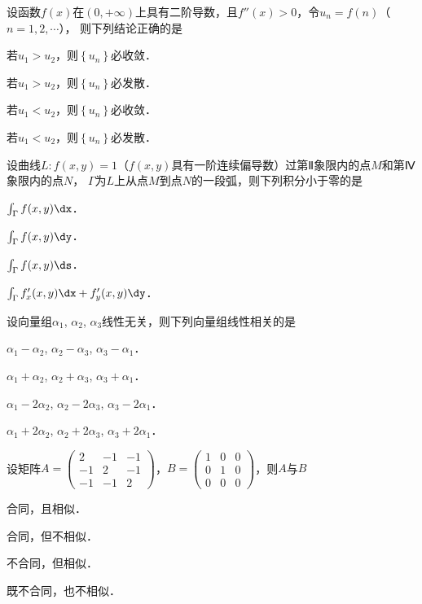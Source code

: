 \documentclass[plain,noanswer,medmath]{../../template/jnuexam}
\begin{document}
\begin{problem}
设函数$f(x)$在$(0, +\infty)$上具有二阶导数，且$f''(x) > 0$，令$u_n = f(n)$（$n=1,2,\cdots$），
则下列结论正确的是\pickout{}
\begin{abcd}
\item 若$u_1 > u_2$，则$\left\{u_n \right\}$必收敛．
\item 若$u_1 > u_2$，则$\left\{u_n \right\}$必发散．
\item 若$u_1 < u_2$，则$\left\{u_n \right\}$必收敛．
\item 若$u_1 < u_2$，则$\left\{u_n \right\}$必发散．
\end{abcd}
\end{problem}


\begin{problem}
设曲线$L:f(x,y) = 1$（$f(x,y)$具有一阶连续偏导数）过第Ⅱ象限内的点$M$和第Ⅳ象限内的点$N$，
$\Gamma$为$L$上从点$M$到点$N$的一段弧，则下列积分小于零的是\pickout{}
\begin{abcd}
\item $\int_{\Gamma}f(x,y)\dx$．
\item $\int_{\Gamma}f(x,y)\dy$．
\item $\int_{\Gamma}f(x,y)\ds$．
\item $\int_{\Gamma}f'_x(x,y)\dx + f'_y(x,y)\dy$．
\end{abcd}
\end{problem}


\begin{problem}
设向量组$\alpha_1$, $\alpha_2$, $\alpha_3$线性无关，则下列向量组线性相关的是\pickout{}
\begin{abcd}
\item $\alpha_1 - \alpha_2$, $\alpha_2 - \alpha_3$, $\alpha_3 - \alpha_1$．
\item $\alpha_1 + \alpha_2$, $\alpha_2 + \alpha_3$, $\alpha_3 + \alpha_1$．
\item $\alpha_1 - 2\alpha_2$, $\alpha_2 - 2\alpha_3$, $\alpha_3 - 2\alpha_1$．
\item $\alpha_1 + 2\alpha_2$, $\alpha_2 + 2\alpha_3$, $\alpha_3 + 2\alpha_1$．
\end{abcd}
\end{problem}


\begin{problem}
设矩阵$A = \begin{pmatrix}
   2 & -1 & -1 \\
  -1 &  2 & -1 \\
  -1 & -1 & 2
\end{pmatrix}$，$B = \begin{pmatrix}
  1 & 0 & 0 \\
  0 & 1 & 0 \\
  0 & 0 & 0
\end{pmatrix}$，则$A$与$B$\pickout{}
\begin{abcd}
\item 合同，且相似．
\item 合同，但不相似．
\item 不合同，但相似．
\item 既不合同，也不相似．
\end{abcd}
\end{problem}
\end{document}
